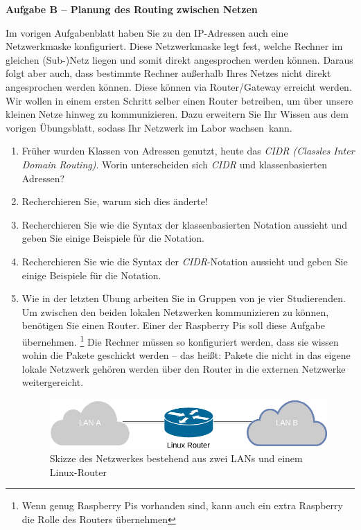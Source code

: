 \documentclass[paper=a4,fontsize=11pt]{scrartcl}%
\numberwithin{equation}{section}
\begin{document}
\begin{center}
\Large{\textbf{Aufgabe B -- Planung des Routing zwischen Netzen}}
\end{center}
\vskip0.25in
Im vorigen Aufgabenblatt haben Sie zu den IP-Adressen auch eine Netzwerkmaske konfiguriert. Diese Netzwerkmaske legt fest, welche Rechner im gleichen (Sub-)Netz liegen und somit direkt angesprochen werden können. Daraus folgt aber auch, dass bestimmte Rechner außerhalb Ihres Netzes nicht direkt angesprochen werden können. Diese können via Router/Gateway erreicht werden.\\
Wir wollen in einem ersten Schritt selber einen Router betreiben, um über unsere kleinen Netze hinweg zu kommunizieren. Dazu erweitern Sie Ihr Wissen aus dem vorigen Übungsblatt, sodass Ihr Netzwerk im Labor \glqq wachsen\grqq\ kann.
\begin{enumerate}
	\item Früher wurden Klassen von Adressen genutzt, heute das \emph{CIDR (Classles Inter Domain Routing)}. Worin unterscheiden sich \emph{CIDR} und klassenbasierten Adressen?
	\item Recherchieren Sie, warum sich dies änderte!
	\item Recherchieren Sie wie die Syntax der klassenbasierten Notation aussieht und geben Sie einige Beispiele für die Notation.
	\item Recherchieren Sie wie die Syntax der \emph{CIDR}-Notation aussieht und geben Sie einige Beispiele für die Notation.
	\item Wie in der letzten Übung arbeiten Sie in Gruppen von je vier Studierenden.\\
	Um zwischen den beiden lokalen Netzwerken kommunizieren zu können, benötigen Sie einen Router. Einer der Raspberry Pis  soll diese Aufgabe übernehmen. \footnote{Wenn genug Raspberry Pis vorhanden sind, kann auch ein extra Raspberry die Rolle des Routers übernehmen} Die Rechner müssen so konfiguriert werden, dass sie wissen wohin die Pakete geschickt werden -- das heißt: Pakete die nicht in das eigene lokale Netzwerk gehören werden über den Router in die externen Netzwerke weitergereicht.
	\begin{figure}[H]
	\centering
	\includegraphics[scale=0.35]{lan}
	\caption{Skizze des Netzwerkes bestehend aus zwei LANs und einem Linux-Router}

\end{figure}
\end{enumerate}
\end{document}
